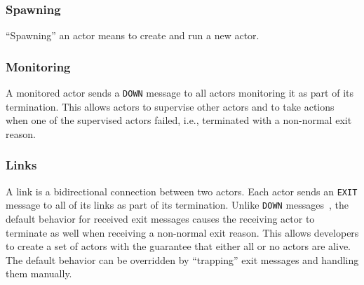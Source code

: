 \subsubsection{Spawning}

``Spawning'' an actor means to create and run a new actor.

\subsubsection{Monitoring}
\label{sec:monitoring}

A monitored actor sends a \texttt{DOWN} message to all actors monitoring it as part of its termination.
This allows actors to supervise other actors and to take actions when one of the supervised actors failed, i.e., terminated with a non-normal exit reason.

\subsubsection{Links}

A link is a bidirectional connection between two actors.
Each actor sends an \texttt{EXIT} message to all of its links as part of its termination.
Unlike \texttt{DOWN} messages~, the default behavior for received exit messages causes the receiving actor to terminate as well when receiving a non-normal exit reason.
This allows developers to create a set of actors with the guarantee that either all or no actors are alive.
The default behavior can be overridden by ``trapping'' exit messages and handling them manually.